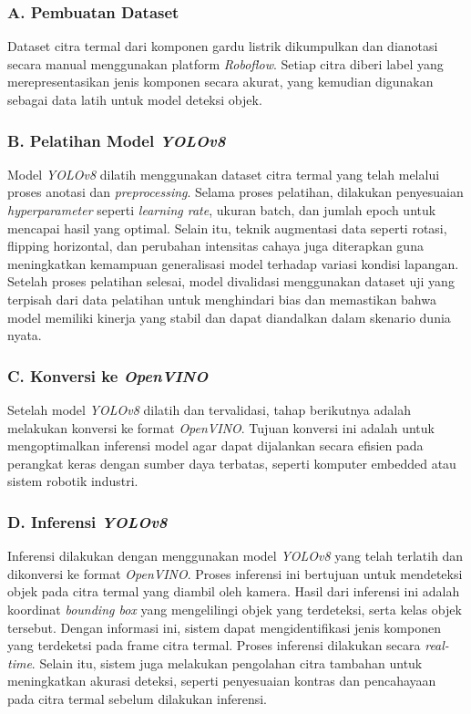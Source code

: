 \subsubsection*{A. Pembuatan Dataset}
Dataset citra termal dari komponen gardu listrik dikumpulkan dan dianotasi secara manual menggunakan platform \emph{Roboflow}. Setiap citra diberi label yang merepresentasikan jenis komponen secara akurat, yang kemudian digunakan sebagai data latih untuk model deteksi objek.

\subsubsection*{B. Pelatihan Model \emph{YOLOv8}}
Model \emph{YOLOv8} dilatih menggunakan dataset citra termal yang telah melalui proses anotasi dan \emph{preprocessing}. Selama proses pelatihan, dilakukan penyesuaian \emph{hyperparameter} seperti \emph{learning rate}, ukuran batch, dan jumlah epoch untuk mencapai hasil yang optimal. Selain itu, teknik augmentasi data seperti rotasi, flipping horizontal, dan perubahan intensitas cahaya juga diterapkan guna meningkatkan kemampuan generalisasi model terhadap variasi kondisi lapangan. Setelah proses pelatihan selesai, model divalidasi menggunakan dataset uji yang terpisah dari data pelatihan untuk menghindari bias dan memastikan bahwa model memiliki kinerja yang stabil dan dapat diandalkan dalam skenario dunia nyata.


\subsubsection*{C. Konversi ke \emph{OpenVINO}}
Setelah model \emph{YOLOv8} dilatih dan tervalidasi, tahap berikutnya adalah melakukan konversi ke format \emph{OpenVINO}. Tujuan konversi ini adalah untuk mengoptimalkan inferensi model agar dapat dijalankan secara efisien pada perangkat keras dengan sumber daya terbatas, seperti komputer embedded atau sistem robotik industri.

\subsubsection*{D. Inferensi \emph{YOLOv8}}
Inferensi dilakukan dengan menggunakan model \emph{YOLOv8} yang telah terlatih dan dikonversi ke format \emph{OpenVINO}. Proses inferensi ini bertujuan untuk mendeteksi objek pada citra termal yang diambil oleh kamera. Hasil dari inferensi ini adalah koordinat \emph{bounding box} yang mengelilingi objek yang terdeteksi, serta kelas objek tersebut. Dengan informasi ini, sistem dapat mengidentifikasi jenis komponen yang terdeketsi pada frame citra termal. Proses inferensi dilakukan secara \emph{real-time}. Selain itu, sistem juga melakukan pengolahan citra tambahan untuk meningkatkan akurasi deteksi, seperti penyesuaian kontras dan pencahayaan pada citra termal sebelum dilakukan inferensi.
